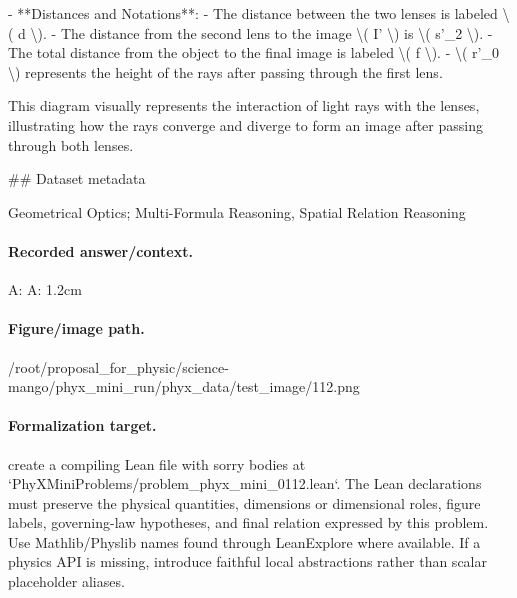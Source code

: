 - **Distances and Notations**:
  - The distance between the two lenses is labeled \textbackslash{}( d \textbackslash{}).
  - The distance from the second lens to the image \textbackslash{}( I' \textbackslash{}) is \textbackslash{}( s'\_2 \textbackslash{}).
  - The total distance from the object to the final image is labeled \textbackslash{}( f \textbackslash{}).
  - \textbackslash{}( r'\_0 \textbackslash{}) represents the height of the rays after passing through the first lens.

This diagram visually represents the interaction of light rays with the lenses, illustrating how the rays converge and diverge to form an image after passing through both lenses.

\#\# Dataset metadata

Geometrical Optics; Multi-Formula Reasoning, Spatial Relation Reasoning

\paragraph{Recorded answer/context.}
A: A: 1.2cm

\paragraph{Figure/image path.}
/root/proposal\_for\_physic/science-mango/phyx\_mini\_run/phyx\_data/test\_image/112.png

\paragraph{Formalization target.}
create a compiling Lean file with sorry bodies at `PhyXMiniProblems/problem\_phyx\_mini\_0112.lean`. The Lean declarations must preserve the physical quantities, dimensions or dimensional roles, figure labels, governing-law hypotheses, and final relation expressed by this problem.
Use Mathlib/Physlib names found through LeanExplore where available. If a physics API is missing, introduce faithful local abstractions rather than scalar placeholder aliases.

